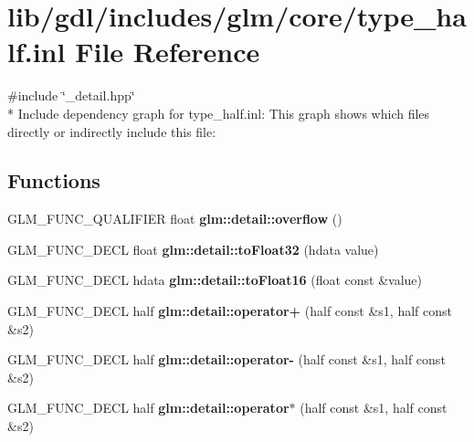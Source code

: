 \hypertarget{type__half_8inl}{}\section{lib/gdl/includes/glm/core/type\+\_\+half.inl File Reference}
\label{type__half_8inl}
{\ttfamily \#include \char`\"{}\+\_\+detail.\+hpp\char`\"{}}\\*
Include dependency graph for type\+\_\+half.\+inl\+:
This graph shows which files directly or indirectly include this file\+:
\subsection*{Functions}
\begin{DoxyCompactItemize}
\item 
\hypertarget{namespaceglm_1_1detail_a61efe122333bc00e81c57e0927bfdfb3}{}G\+L\+M\+\_\+\+F\+U\+N\+C\+\_\+\+Q\+U\+A\+L\+I\+F\+I\+E\+R float {\bfseries glm\+::detail\+::overflow} ()\label{namespaceglm_1_1detail_a61efe122333bc00e81c57e0927bfdfb3}

\item 
\hypertarget{namespaceglm_1_1detail_a8e4719d94d99ee1e625496e04317272b}{}G\+L\+M\+\_\+\+F\+U\+N\+C\+\_\+\+D\+E\+C\+L float {\bfseries glm\+::detail\+::to\+Float32} (hdata value)\label{namespaceglm_1_1detail_a8e4719d94d99ee1e625496e04317272b}

\item 
\hypertarget{namespaceglm_1_1detail_ac16321696a34b41c55f941b319d50652}{}G\+L\+M\+\_\+\+F\+U\+N\+C\+\_\+\+D\+E\+C\+L hdata {\bfseries glm\+::detail\+::to\+Float16} (float const \&value)\label{namespaceglm_1_1detail_ac16321696a34b41c55f941b319d50652}

\item 
\hypertarget{namespaceglm_1_1detail_a2156d538bd360f2cf8eb0259ffd0fcee}{}G\+L\+M\+\_\+\+F\+U\+N\+C\+\_\+\+D\+E\+C\+L half {\bfseries glm\+::detail\+::operator+} (half const \&s1, half const \&s2)\label{namespaceglm_1_1detail_a2156d538bd360f2cf8eb0259ffd0fcee}

\item 
\hypertarget{namespaceglm_1_1detail_a95c2e07ba4e13b8ae23147b76624500b}{}G\+L\+M\+\_\+\+F\+U\+N\+C\+\_\+\+D\+E\+C\+L half {\bfseries glm\+::detail\+::operator-\/} (half const \&s1, half const \&s2)\label{namespaceglm_1_1detail_a95c2e07ba4e13b8ae23147b76624500b}

\item 
\hypertarget{namespaceglm_1_1detail_a02505d56c5e061fa54725f153fca6160}{}G\+L\+M\+\_\+\+F\+U\+N\+C\+\_\+\+D\+E\+C\+L half {\bfseries glm\+::detail\+::operator$\ast$} (half const \&s1, half const \&s2)\label{namespaceglm_1_1detail_a02505d56c5e061fa54725f153fca6160}


\end{DoxyCompactItemize}
